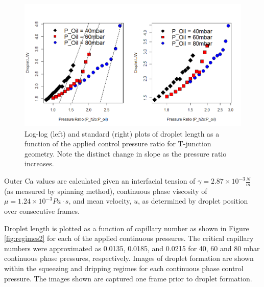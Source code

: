 \begin{figure}[H]
\centering 
\includegraphics[width=01.0\columnwidth]{lwvpr.PNG} 
\caption[Droplet Length as a Function of Applied Control Pressure Ratio]{Log-log (left) and standard (right) plots of droplet length as a function of the applied control pressure ratio for T-junction geometry. Note the distinct change in slope as the pressure ratio increases.} 
\label{fig:lwvpr} 
\end{figure}

Outer Ca values are calculated given an interfacial tension of $\gamma = 2.87 \times 10^{-3}\frac{N}{m}$ (as measured by spinning method), continuous phase viscosity of $\mu = 1.24 \times 10^{-3} Pa \cdot s$\cite{3M2009}, and mean velocity, $u$, as determined by droplet position over consecutive frames.

Droplet length is plotted as a function of capillary number as shown in Figure \vref{fig:regimes2} for each of the applied continuous pressures. The critical capillary numbers were approximated as 0.0135, 0.0185, and 0.0215 for 40, 60 and 80 mbar continuous phase pressures, respectively. Images of droplet formation are shown within the squeezing and dripping regimes for each continuous phase control pressure. The images shown are captured one frame prior to droplet formation. 

